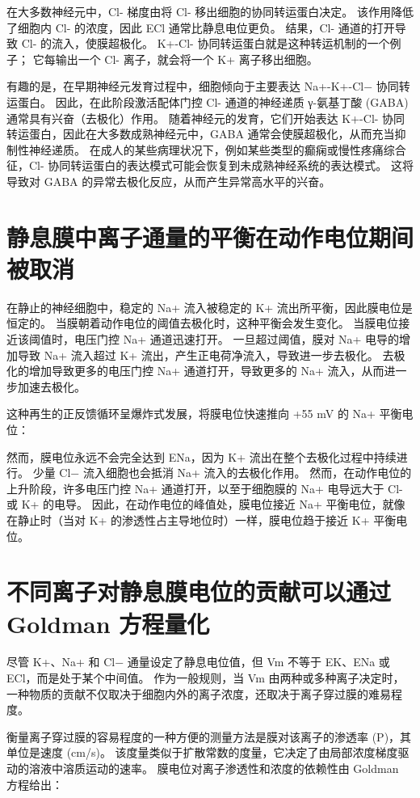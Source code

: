 在大多数神经元中，Cl- 梯度由将 Cl- 移出细胞的协同转运蛋白决定。 
该作用降低了细胞内 Cl- 的浓度，因此 ECl 通常比静息电位更负。 
结果，Cl- 通道的打开导致 Cl- 的流入，使膜超极化。 
K+-Cl- 协同转运蛋白就是这种转运机制的一个例子； 它每输出一个 Cl- 离子，就会将一个 K+ 离子移出细胞。


有趣的是，在早期神经元发育过程中，细胞倾向于主要表达 Na+-K+-Cl− 协同转运蛋白。 
因此，在此阶段激活配体门控 Cl- 通道的神经递质 γ-氨基丁酸 (GABA) 通常具有兴奋（去极化）作用。 
随着神经元的发育，它们开始表达 K+-Cl- 协同转运蛋白，因此在大多数成熟神经元中，GABA 通常会使膜超极化，从而充当抑制性神经递质。 
在成人的某些病理状况下，例如某些类型的癫痫或慢性疼痛综合征，Cl- 协同转运蛋白的表达模式可能会恢复到未成熟神经系统的表达模式。 
这将导致对 GABA 的异常去极化反应，从而产生异常高水平的兴奋。



\section{静息膜中离子通量的平衡在动作电位期间被取消}

在静止的神经细胞中，稳定的 Na+ 流入被稳定的 K+ 流出所平衡，因此膜电位是恒定的。 
当膜朝着动作电位的阈值去极化时，这种平衡会发生变化。 
当膜电位接近该阈值时，电压门控 Na+ 通道迅速打开。 
一旦超过阈值，膜对 Na+ 电导的增加导致 Na+ 流入超过 K+ 流出，产生正电荷净流入，导致进一步去极化。 
去极化的增加导致更多的电压门控 Na+ 通道打开，导致更多的 Na+ 流入，从而进一步加速去极化。


这种再生的正反馈循环呈爆炸式发展，将膜电位快速推向 +55 mV 的 Na+ 平衡电位：

然而，膜电位永远不会完全达到 ENa，因为 K+ 流出在整个去极化过程中持续进行。 
少量 Cl− 流入细胞也会抵消 Na+ 流入的去极化作用。 
然而，在动作电位的上升阶段，许多电压门控 Na+ 通道打开，以至于细胞膜的 Na+ 电导远大于 Cl- 或 K+ 的电导。 
因此，在动作电位的峰值处，膜电位接近 Na+ 平衡电位，就像在静止时（当对 K+ 的渗透性占主导地位时）一样，膜电位趋于接近 K+ 平衡电位。


\section{不同离子对静息膜电位的贡献可以通过 Goldman 方程量化}
尽管 K+、Na+ 和 Cl− 通量设定了静息电位值，但 Vm 不等于 EK、ENa 或 ECl，而是处于某个中间值。 
作为一般规则，当 Vm 由两种或多种离子决定时，一种物质的贡献不仅取决于细胞内外的离子浓度，还取决于离子穿过膜的难易程度。


衡量离子穿过膜的容易程度的一种方便的测量方法是膜对该离子的渗透率 (P)，其单位是速度 (cm/s)。 
该度量类似于扩散常数的度量，它决定了由局部浓度梯度驱动的溶液中溶质运动的速率。 
膜电位对离子渗透性和浓度的依赖性由 Goldman 方程给出：



